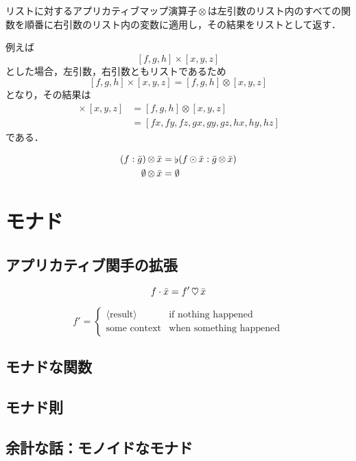 \documentclass[twocolumn]{jsbook}
\DeclareMathOperator{\hsklApplicativeMap}{\times}
\DeclareMathOperator{\hsklApplicativeListMap}{\otimes}
\DeclareMathOperator{\hsklConcat}{\flat}
\DeclareMathOperator{\hsklMap}{\odot}
\newcommand{\hsklEmptyList}{\emptyset}
\newcommand{\hsklList}[1]{\Bar{#1}}
\begin{document}
リストに対するアプリカティブマップ演算子$\hsklApplicativeListMap$は左引数のリスト内のすべての関数を順番に右引数のリスト内の変数に適用し，その結果をリストとして返す．

例えば$$[f,g,h]\hsklApplicativeMap[x,y,z]$$とした場合，左引数，右引数ともリストであるため$$[f,g,h]\hsklApplicativeMap[x,y,z]=[f,g,h]\hsklApplicativeListMap[x,y,z]$$となり，その結果は
\begin{align*}
[f,g,h]\hsklApplicativeMap[x,y,z]&=[f,g,h]\hsklApplicativeListMap[x,y,z]\\
&=[fx,fy,fz,gx,gy,gz,hx,hy,hz]
\end{align*}
である．


\begin{align*}
(f:\hsklList{g})\hsklApplicativeListMap\hsklList{x}&=\hsklConcat(f\hsklMap\hsklList{x}:\hsklList{g}\hsklApplicativeListMap\hsklList{x})\\
\hsklEmptyList\hsklApplicativeListMap\hsklList{x}&=\hsklEmptyList
\end{align*}



\chapter{モナド}

\section{アプリカティブ関手の拡張}

$$f\cdot\Bar x=f'\mathop\heartsuit\Bar x$$

$$f'=\begin{cases}\langle\text{result}\rangle&\text{if nothing happened}\\
\text{some context}&\text{when something happened}\end{cases}$$

\section{モナドな関数}


\section{モナド則}

\section*{余計な話：モノイドなモナド}
\end{document}
